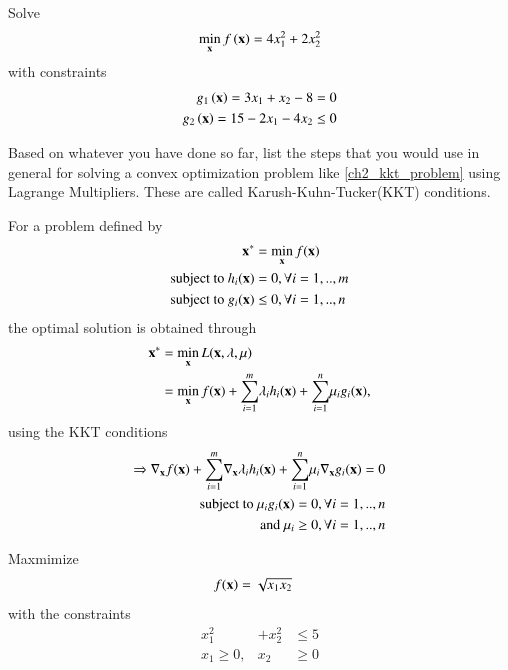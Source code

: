 \documentclass[journal,12pt,twocolumn]{IEEEtran}
\begin{document}
%
%
\begin{problem}
Solve
 \begin{align}
\min_{\mathbf{x}} f\left(\mathbf{x}\right) = 4x_1^2 + 2x_2^2
 \end{align}
 with constraints
 \begin{align}
 g_1\left(\mathbf{x}\right) = 3x_1 + x_2-8 = 0\\
 g_2 \left(\mathbf{x}\right)= 15 - 2x_1 - 4x_2 \leq 0
 \end{align}
 \end{problem}
%
\begin{problem}
Based on whatever you have done so far,	list the steps that you would use in general for solving a convex optimization problem  like \eqref{ch2_kkt_problem}  using Lagrange Multipliers. 
These are called Karush-Kuhn-Tucker(KKT) conditions.
\end{problem}
\solution For a problem defined by 
\begin{align}
\mathbf{x^*} &= \min_{\mathbf{x}}f(\mathbf{x})
\\
\text{subject to } h_i(\mathbf{x}) &= 0, \forall i=1,..,m
\\
\text{subject to } g_i(\mathbf{x}) &\le 0, \forall i=1,..,n
\end{align}
%
the optimal solution is obtained through
%
\begin{align}
\mathbf{x^*} &= \min_{\mathbf{x}}L(\mathbf{x}, \mathbf{\lambda}, \mathbf{\mu}) 
\\
&= \min_{\mathbf{x}}f(\mathbf{x})  + \underset{i=1}{\overset{m}{\sum}} \lambda_i h_i(\mathbf{x}) + \underset{i=1}{\overset{n}{\sum}} \mu_i g_i(\mathbf{x}),
\end{align}
%
using the KKT conditions
%
\begin{align}
\Rightarrow \nabla_\mathbf{x} f(\mathbf{x})  + \underset{i=1}{\overset{m}{\sum}} \nabla_\mathbf{x} \lambda_i h_i(\mathbf{x}) + \underset{i=1}{\overset{n}{\sum}} \mu_i \nabla_\mathbf{x} g_i(\mathbf{x}) = 0 
\\
\text{subject to }\mu_i g_i(\mathbf{x}) = 0, \forall i = 1,..,n
\\
\text{and }\mu_i \ge 0, \forall i = 1,..,n
\end{align}
%
\begin{problem}
	Maxmimize 
	\begin{align}
	f(\mathbf{x}) &= \sqrt{x_1x_2}
	\end{align}
	with the constraints
	\begin{align}
	x_1^2&+x_2^2 &\leq 5 \\
	x_1 \geq 0,& x_2 &\geq 0
	\end{align}
\end{problem}
\end{document}
